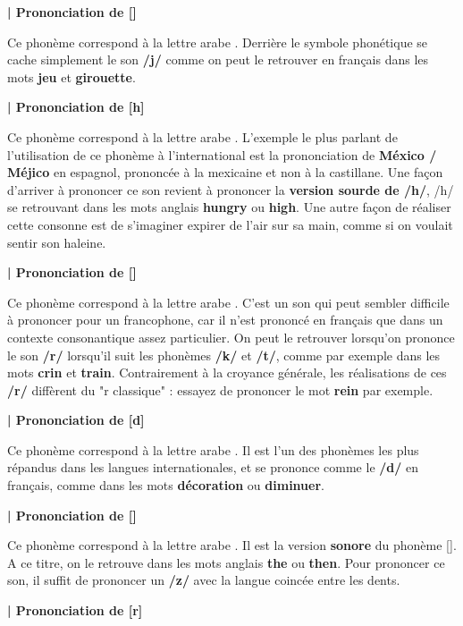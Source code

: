 \textbf{| Prononciation de  [\textyogh]}

Ce phonème correspond à la lettre arabe . Derrière le symbole phonétique se cache simplement le son \textbf{/j/} comme on peut le retrouver en français dans les mots \textbf{jeu} et \textbf{girouette}.


\textbf{| Prononciation de  [h]}

Ce phonème correspond à la lettre arabe . L'exemple le plus parlant de l'utilisation de ce phonème à l'international est la prononciation de \textbf{México / Méjico} en espagnol, prononcée à la mexicaine et non à la castillane. Une façon d'arriver à prononcer ce son revient à prononcer la \textbf{version sourde de /h/}, /h/ se retrouvant dans les mots anglais \textbf{hungry} ou \textbf{high}. Une autre façon de réaliser cette consonne est de s'imaginer expirer de l'air sur sa main, comme si on voulait sentir son haleine.

\textbf{| Prononciation de  [\textchi]}

Ce phonème correspond à la lettre arabe . C'est un son qui peut sembler difficile à prononcer pour un francophone, car il n'est prononcé en français que dans un contexte consonantique assez particulier. On peut le retrouver lorsqu'on prononce le son \textbf{/r/} lorsqu'il suit les phonèmes \textbf{/k/} et \textbf{/t/}, comme par exemple dans les mots \textbf{crin} et \textbf{train}. Contrairement à la croyance générale, les réalisations de ces \textbf{/r/} diffèrent du "r classique" : essayez de prononcer le mot \textbf{rein} par exemple.


\textbf{| Prononciation de  [d]}

Ce phonème correspond à la lettre arabe . Il est l'un des phonèmes les plus répandus dans les langues internationales, et se prononce comme le \textbf{/d/} en français, comme dans les mots \textbf{décoration} ou \textbf{diminuer}.


\textbf{| Prononciation de  [\dh]}

Ce phonème correspond à la lettre arabe . Il est la version \textbf{sonore} du phonème  [\texttheta]. A ce titre, on le retrouve dans les mots anglais \textbf{the} ou \textbf{then}. Pour prononcer ce son, il suffit de prononcer un \textbf{/z/} avec la langue coincée entre les dents.


\textbf{| Prononciation de  [r]}

